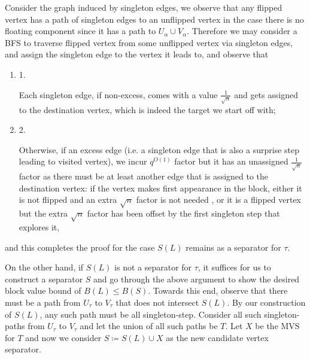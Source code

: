 Consider the graph induced by singleton edges, we observe that any flipped vertex has a path of singleton edges to an unflipped vertex in the case there is no floating component since it has a path to $U_{\alpha}\cup V_{\alpha}$. Therefore we may consider a BFS to traverse flipped vertex from some unflipped vertex via singleton edges, and assign the singleton edge to the vertex it leads to, and observe that\par


\begin{enumerate}


\item[] 
1. 


Each singleton edge, if non-excess, comes with a value $\frac{1}{\sqrt{n}}$ and gets assigned to the destination vertex, which is indeed the target we start off with;\par





\item[] 
2. 


Otherwise, if an excess edge (i.e. a singleton edge that is also a surprise step leading to visited vertex), we incur $q^{O(1)}$ factor but it has an unassigned $\frac{1}{\sqrt{n}}$ factor as there must be at least another edge that is assigned to the destination vertex: if the vertex makes first appearance in the block, either it is not flipped and an extra $\sqrt{n}$ factor is not needed , or it is a flipped vertex but the extra $\sqrt{n}$ factor has been offset by the first singleton step that explores it\thinspace{},\par





\end{enumerate}


and this completes the proof for the case $S(L)$ remains as a separator for $\tau$.\par




On the other hand, if $S(L)$ is not a separator for $\tau$, it suffices for us to construct a separator $S$ and go through the above argument to show the desired block value bound of $B(L)\leq B(S)$. Towards this end, observe that there must be a path from $U_{\tau}$ to $V_{\tau}$ that does not intersect $S(L)$. By our construction of $S(L)$, any such path must be all singleton-step. Consider all such singleton-paths from $U_{\tau}$ to $V_{\tau}$ and let the union of all such paths be $T$. Let $X$ be the MVS for $T$ and now we consider $S\coloneqq S(L)\cup X$ as the new candidate vertex separator.\par




